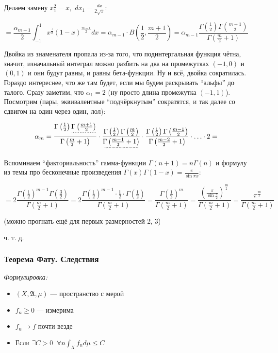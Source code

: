 \documentclass{article}
\def\dbl{\,\,}
\begin{document}
Делаем замену $x_1^2 = x, \dbl dx_1 = \frac{dx}{2\sqrt{x}}$:

\[= \frac{\alpha_{m - 1}}{2} \int_{-1}^{1} x^{\frac{1}{2}}(1 - x)^{\frac{m - 1}{2}}dx = \alpha_{m - 1} \cdot B\left(\frac{1}{2}, \frac{m + 1}{2}\right) = \alpha_{m - 1}\frac{\Gamma\left(\frac{1}{2}\right)\Gamma\left(\frac{m + 1}{2}\right)}{\Gamma\left(\frac{m}{2} + 1\right)}\]

Двойка из знаменателя пропала из-за того, что подинтергальная функция чётна, значит, изначальный интеграл можно разбить на два на промежутках $(-1, 0)$ и $(0, 1)$ и они будут равны, и равны бета-функции. Ну и всё, двойка сократилась. Гораздо интереснее, что же там будет, если мы будем раскрывать ``альфы'' до талого. Сразу заметим, что $\alpha_1 = 2$ (ну просто длина промежутка $(-1, 1)$). Посмотрим (пары, эквивалентные ``подчёркнутым'' сократятся, и так далее со сдвигом на один через один, лол):

\[\alpha_{m} = \frac{\Gamma\left(\frac{1}{2}\right)\uwave{\Gamma\left(\frac{m + 1}{2}\right)}}{\Gamma\left(\frac{m}{2} + 1\right)} \cdot \frac{\Gamma\left(\frac{1}{2}\right)\Gamma\left(\frac{m}{2}\right)}{\uwave{\Gamma\left(\frac{m - 1}{2} + 1\right)}} \cdot \frac{\Gamma\left(\frac{1}{2}\right)\Gamma\left(\frac{m - 1}{2}\right)}{\Gamma\left(\frac{m - 2}{2} + 1\right)} \cdot \ldots \cdot 2 = \]

Вспоминаем ``факториальность'' гамма-функции $\Gamma(n + 1) = n\Gamma(n)$ и формулу из темы про бесконечные произведения $\Gamma(x)\Gamma(1 - x) = \frac{\pi}{\sin \pi x}$:

\[= 2\frac{\Gamma\left(\frac{1}{2}\right)^{m - 1}\Gamma\left(\frac{3}{2}\right)}{\Gamma\left(\frac{m}{2} + 1\right)} = 2\frac{\Gamma\left(\frac{1}{2}\right)^{m - 1}\cdot \frac{1}{2} \cdot\Gamma\left(\frac{1}{2}\right)}{\Gamma\left(\frac{m}{2} + 1\right)} = \frac{\Gamma\left(\frac{1}{2}\right)^{m}}{\Gamma\left(\frac{m}{2} + 1\right)} = \frac{\left(\frac{\pi}{\sin \frac{\pi}{2}}\right)^{\frac{m}{2}}}{\Gamma\left(\frac{m}{2} + 1\right)} = \frac{\pi^{\frac{m}{2}}}{\Gamma\left(\frac{m}{2} + 1\right)}\]

(можно прогнать ещё для первых размерностей 2, 3)

ч. т. д.

\subsubsection{Теорема Фату. Следствия}
\textit{Формулировка:}

\begin{itemize}
    \item $(X, \mathfrak{A}, \mu)$ --- пространство с мерой
    \item $f_n \ge 0$ --- измерима
    \item $f_n \rightarrow f$ почти везде
    \item Если $\exists C > 0\ \dbl \forall n \int_{X} f_n d\mu \le C$  
\end{itemize}
\end{document}
